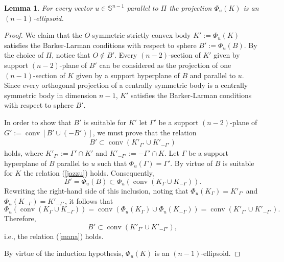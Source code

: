 \documentclass[12pt]{amsart}
\newcommand{\conv}{\operatorname*{conv}}
\newtheorem{lemma}{Lemma}
\begin{document}
\begin{lemma}\label{chiquita}
                  For every vector $u\in \mathbb{S}^{n-1}$ parallel to $\Pi$ the projection $\Phi_u(K)$ is 
                  an $(n-1)$-ellipsoid.
\end{lemma}
\begin{proof}
                  We claim that the $O$-symmetric strictly convex body $K':=\Phi_u(K)$ satisfies the 
                  Barker-Larman conditions with respect to sphere $B':=\Phi_u(B)$. By the choice of $\Pi$, 
                  notice that $O\notin B'$. Every $(n-2)$-section of $ K'$ given by support 
                  $(n-2)$-plane of $B'$ can be considered as the projection of one $(n-1)$-section 
                  of $K$ given by a support hyperplane of $B$ and pa\-ra\-llel to $u$. Since every 
                  orthogonal projection of a centrally symmetric body is a centrally symmetric body in 
                  dimension $n-1$, $K'$ satisfies the Barker-Larman conditions with respect to sphere $B'$.
                  
                  In order to show that $B'$ is suitable for $K'$ let $\Gamma'$ be a support $(n-2)$-plane of 
                   $G':=\conv[ B'\cup (-B')]$, we must prove that the relation
\begin{eqnarray}\label{mana}
                  B'\subset \conv (K'_{\Gamma'} \cup K'_{-\Gamma'} )  
\end{eqnarray} 
                  holds, where $K'_{\Gamma'}:=\Gamma' \cap K' $ and 
                  $K'_{-\Gamma'}:=-\Gamma' \cap K $. Let $\Gamma$ be a support hyperplane of $B$ 
                  parallel to $u$ such that $\Phi_u(\Gamma)=\Gamma'$. By virtue of $B$ is suitable 
                  for $K$ the relation (\ref{jazzu}) holds. Consequently,  
\[                  
                  B'=\Phi_u( B)\subset \Phi_u(\conv (K_{\Gamma} \cup K_{-\Gamma} )).  
\]                
                  Rewriting the right-hand side of this inclusion, noting that 
                  $\Phi_u(K_{\Gamma})=K'_{\Gamma'}$ and $\Phi_u(K_{-\Gamma})=K'_{-\Gamma'}$, it follows that
\[
\Phi_u(\conv (K_{\Gamma} \cup K_{-\Gamma}))=\conv (\Phi_u(K_{\Gamma}) \cup \Phi_u(K_{-\Gamma}))=\conv (K'_{\Gamma'} \cup K'_{-\Gamma'}). 
\]
                  Therefore, 
\[
B'\subset \conv (K'_{\Gamma'} \cup K'_{-\Gamma'}),
\]                
                  i.e., the relation (\ref{mana}) holds. 
                  
                  By virtue of the induction hypothesis, $\Phi_u(K)$ is an $(n-1)$-ellipsoid.     
\end{proof}
\end{document}
